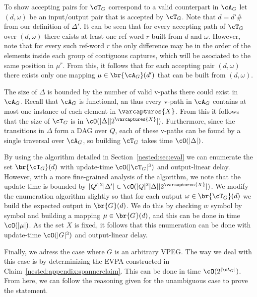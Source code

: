 To show accepting pairs for $\cT_G$ correspond to a valid counterpart in $\cA_G$ let $(d,\omega)$ be an input/output pair that is accepted by $\cT_G$. Note that $d = d'\#$ from our definition of $\Delta'$. It can be seen that for every accepting path of $\cT_G$ over $(d,\omega)$ there exists at least one ref-word $r$ built from $d$ and $\omega$. However, note that for every such ref-word $r$ the only difference may be in the order of the elements inside each group of contiguous captures, which will be asociated to the same position in $\mu^r$. From this, it follows that for each accepting pair $(d,\omega)$ there exists only one mapping $\mu\in\br{\cA_G}(d')$ that can be built from $(d,\omega)$.

The size of $\Delta$ is bounded by the number of valid v-paths there could exist in $\cA_G$. Recall that $\cA_G$ is functional, an thus every v-path in $\cA_G$ contains at most one instance of each element in $\varcaptures{X}$. From this it follows that the size of $\cT_G$ is in $\cO(\vert\Delta\vert\vert 2^{\varcaptures{X}}\vert)$. Furthermore, since the transitions in $\Delta$ form a DAG over $Q$, each of these v-paths can be found by a single traversal over $\cA_G$, so building $\cT_G$ takes time $\cO(\vert\Delta\vert)$.

By using the algorithm detailed in Section~\ref{nested:sec:eval} we can enumerate the set $\br{\cT_G}(d)$ with update-time $\cO(\vert\cT_G\vert^3)$ and output-linear delay. 
However, with a more fine-grained analysis of the algorithm, we note that the update-time is bounded by $\vert Q'\vert^2\vert\Delta'\vert\in \cO(\vert Q\vert^2\vert\Delta\vert\vert 2^{\varcaptures{X}}\vert)$. We modify the enumeration algorithm slightly so that for each output $\omega\in\br{\cT_G}(d)$ we build the expected output in $\br{G}(d)$. We do this by checking $w$ symbol by symbol and building a mapping $\mu\in\br{G}(d)$, and this can be done in time $\cO(\vert\mu\vert)$. As the set $X$ is fixed, it follows that this enumeration can be done with update-time $\cO(\vert G\vert^3)$ and output-linear delay.

Finally, we adress the case where $G$ is an arbitrary VPEG. The way we deal with this case is by determinizing the EVPA constructed in Claim~\ref{nested:appendix:spannerclaim}. This can be done in time $\cO(2^{\vert \cA_G\vert})$. From here, we can follow the reasoning given for the unambiguous case to prove the statement.